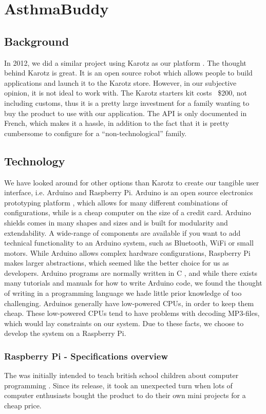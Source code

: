 
\chapter{AsthmaBuddy}
\label{chp:our-solution}

\section{Background}
In 2012, we did a similar project using Karotz  as our platform \cite{CustomerDriven}. The thought behind Karotz is great. It is an open source robot which allows people to build applications and launch it to the Karotz store. However, in our subjective opinion, it is not ideal to work with. The Karotz starters kit costs ~\$200, not including customs, thus it is a pretty large investment for a family wanting to buy the product to use with our application. The API is only documented in French, which makes it a hassle, in addition to the fact that it is pretty cumbersome to configure for a ``non-technological'' family. 

\section{Technology}
We have looked around for other options than Karotz to create our tangible user interface, i.e. Arduino and Raspberry Pi. Arduino is an open source electronics prototyping platform \cite{arduino}, which allows for many different combinations of configurations, while \rpi{} is a cheap computer on the size of a credit card. Arduino shields comes in many shapes and sizes and is built for modularity and extendability. A wide-range of components are available if you want to add technical functionality to an Arduino system, such as Bluetooth, WiFi or small motors. 
While Arduino allows complex hardware configurations, Raspberry Pi makes larger abstractions, which seemed like the better choice for us as developers. Arduino programs are normally written in C \cite{strahl2000language}, and while there exists many tutorials and manuals for how to write Arduino code, we found the thought of writing in a programming language we hade little prior knowledge of too challenging. Arduinos generally have low-powered CPUs, in order to keep them cheap. These low-powered CPUs tend to have problems with decoding MP3-files, which would lay constraints on our system. Due to these facts, we choose to develop the system on a Raspberry Pi.


\subsection{Raspberry Pi - Specifications overview}
The \rpi{} was initially intended to teach british school children about computer programming \cite{rasperrypi-about}. Since its release, it took an unexpected turn when lots of computer enthusiasts bought the product to do their own mini projects for a cheap price. 

